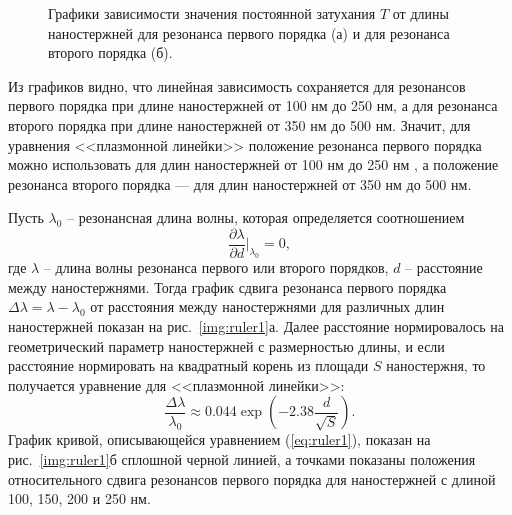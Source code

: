 \begin{figure}
\caption{Графики зависимости значения постоянной затухания $ T $ от длины наностержней для резонанса первого порядка (а) и для резонанса второго порядка (б).}
\label{img:expdecay}
\end{figure}

Из графиков видно, что линейная зависимость сохраняется для резонансов первого порядка при длине наностержней от 100 нм до 250 нм, а для резонанса второго порядка при длине наностержней от 350 нм до 500 нм. Значит, для уравнения <<плазмонной линейки>> положение резонанса первого порядка можно использовать для длин наностержней от 100 нм до 250 нм  , а положение резонанса второго порядка --- для длин наностержней от 350 нм до 500 нм.

Пусть $ \lambda_0 $ -- резонансная длина волны, которая определяется соотношением
\begin{equation}
\dfrac{\partial \lambda}{\partial d} \Big|_{\lambda _0} = 0,
\end{equation}
где $ \lambda $ -- длина волны резонанса первого или второго порядков, $ d $ -- расстояние между наностержнями. Тогда график сдвига резонанса первого порядка $ \Delta \lambda =  \lambda - \lambda_0 $ от расстояния между наностержнями для различных длин наностержней показан на рис.~\ref{img:ruler1}а. Далее расстояние нормировалось на геометрический параметр наностержней с размерностью длины, и если расстояние нормировать на квадратный корень из площади $ S $ наностержня, то получается уравнение для <<плазмонной линейки>>:
\begin{equation}
\frac{\Delta \lambda}{\lambda_0} \approx 0.044 \exp \left( - 2.38 \frac{d}{\sqrt{S}} \right).
\label{eq:ruler1}
\end{equation}
График кривой, описывающейся уравнением (\ref{eq:ruler1}), показан на рис.~\ref{img:ruler1}б сплошной черной линией, а точками показаны положения относительного сдвига резонансов первого порядка для наностержней с длиной 100, 150, 200 и 250 нм.

